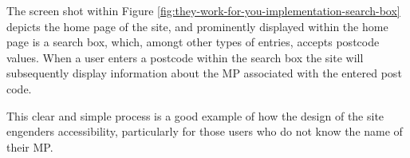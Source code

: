 The screen shot within Figure \ref{fig:they-work-for-you-implementation-search-box} depicts the home page of the site,
and prominently displayed within the home page is a search box, which, amongt other types of entries, accepts postcode \cite{postcodes-uk} values.
When a user enters a postcode within the search box the site will subsequently display information about the MP associated with the entered post code.

This clear and simple process is a good example of how the design of the site engenders accessibility,
particularly for those users who do not know the name of their MP.
